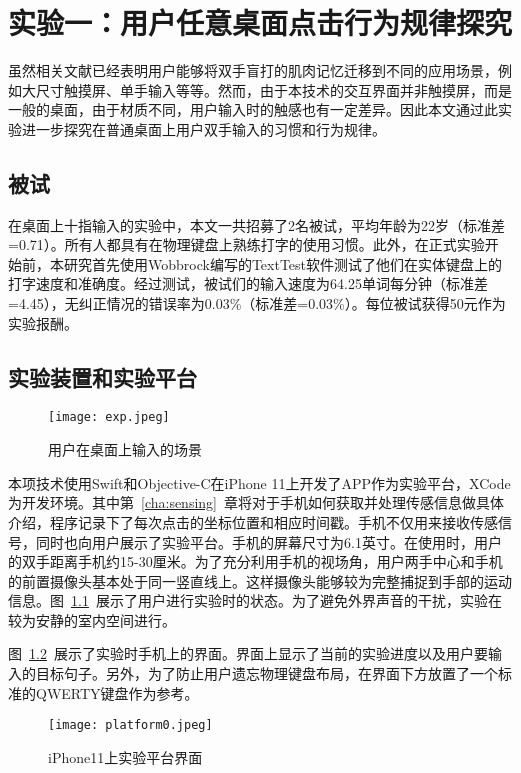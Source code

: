 \chapter{实验一：用户任意桌面点击行为规律探究}
\label{cha:exp1}
虽然相关文献已经表明用户能够将双手盲打的肌肉记忆迁移到不同的应用场景，例如大尺寸触摸屏、单手输入等等。然而，由于本技术的交互界面并非触摸屏，而是一般的桌面，由于材质不同，用户输入时的触感也有一定差异。因此本文通过此实验进一步探究在普通桌面上用户双手输入的习惯和行为规律。


\section{被试}
在桌面上十指输入的实验中，本文一共招募了2名被试，平均年龄为22岁（标准差=0.71）。所有人都具有在物理键盘上熟练打字的使用习惯。此外，在正式实验开始前，本研究首先使用Wobbrock编写的TextTest软件\cite{texttest}\cite{wobbrock2006analyzing}测试了他们在实体键盘上的打字速度和准确度。经过测试，被试们的输入速度为64.25单词每分钟（标准差=4.45），无纠正情况的错误率为0.03\%（标准差=0.03\%）。每位被试获得50元作为实验报酬。

\section{实验装置和实验平台}
\begin{figure}[h] %
    \centering
    \texttt{[image: exp.jpeg]}
    \caption{用户在桌面上输入的场景}
    \label{fig:exp}
\end{figure}
本项技术使用Swift和Objective-C在iPhone 11上开发了APP作为实验平台，XCode为开发环境。其中第~\ref{cha:sensing}~章将对于手机如何获取并处理传感信息做具体介绍，程序记录下了每次点击的坐标位置和相应时间戳。手机不仅用来接收传感信号，同时也向用户展示了实验平台。手机的屏幕尺寸为6.1英寸。在使用时，用户的双手距离手机约15-30厘米。为了充分利用手机的视场角，用户两手中心和手机的前置摄像头基本处于同一竖直线上。这样摄像头能够较为完整捕捉到手部的运动信息。图~\ref{fig:exp}~展示了用户进行实验时的状态。为了避免外界声音的干扰，实验在较为安静的室内空间进行。

图~\ref{fig:platform0}~展示了实验时手机上的界面。界面上显示了当前的实验进度以及用户要输入的目标句子。另外，为了防止用户遗忘物理键盘布局，在界面下方放置了一个标准的QWERTY键盘作为参考。

\begin{figure}[h] %
    \centering
    \texttt{[image: platform0.jpeg]}
    \caption{iPhone11上实验平台界面}
    \label{fig:platform0}
\end{figure}

